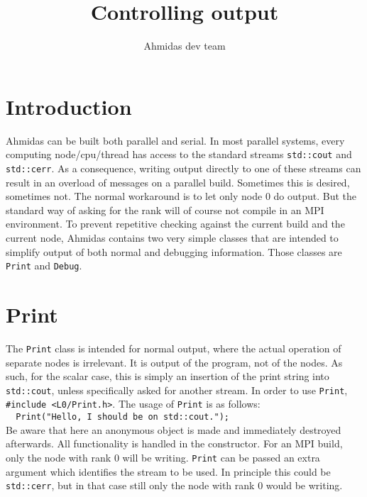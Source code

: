\documentclass[a4paper,10pt]{article}
\title{Controlling output}
\author{Ahmidas dev team}
\begin{document}
\section{Introduction}
Ahmidas can be built both parallel and serial. In most parallel systems, every computing node/cpu/thread has access to the standard streams \verb|std::cout| and \verb|std::cerr|. As a consequence, writing output directly to one of these streams can result in an overload of messages on a parallel build. Sometimes this is desired, sometimes not. The normal workaround is to let only node 0 do output. But the standard way of asking for the rank will of course not compile in an MPI environment. To prevent repetitive checking against the current build and the current node, Ahmidas contains two very simple classes that are intended to simplify output of both normal and debugging information. Those classes are \verb|Print| and \verb|Debug|.
\section{Print}
The \verb|Print| class is intended for normal output, where the actual operation of separate nodes is irrelevant. It is output of the program, not of the nodes. As such, for the scalar case, this is simply an insertion of the print string into \verb|std::cout|, unless specifically asked for another stream. In order to use \verb|Print|, \verb|#include <L0/Print.h>|. The usage of \verb|Print| is as follows:\\
\verb|  Print("Hello, I should be on std::cout.");|\\
Be aware that here an anonymous object is made and immediately destroyed afterwards. All functionality is handled in the constructor. For an MPI build, only the node with rank 0 will be writing. \verb|Print| can be passed an extra argument which identifies the stream to be used. In principle this could be \verb|std::cerr|, but in that case still only the node with rank 0 would be writing.
\end{document}
